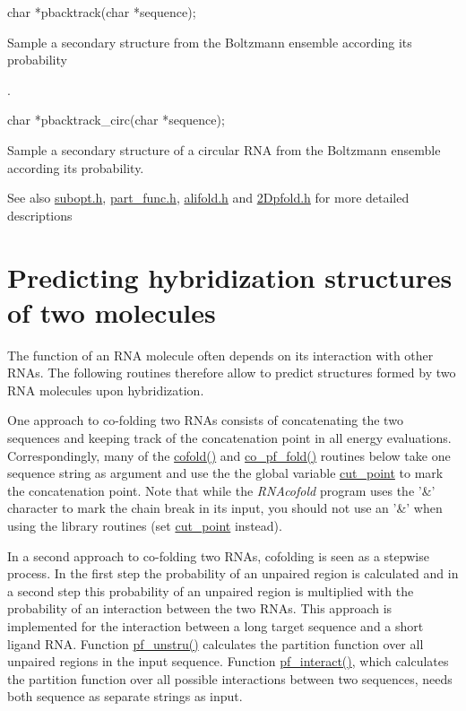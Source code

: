 \begin{DoxyVerb}
char    *pbacktrack(char *sequence);
\end{DoxyVerb}
 Sample a secondary structure from the Boltzmann ensemble according its probability\par
. 

\begin{DoxyVerb}
char    *pbacktrack_circ(char *sequence);
\end{DoxyVerb}
 Sample a secondary structure of a circular RNA from the Boltzmann ensemble according its probability. 

\begin{DoxySeeAlso}{See also}
\hyperlink{subopt_8h}{subopt.h}, \hyperlink{part__func_8h}{part\_\-func.h}, \hyperlink{alifold_8h}{alifold.h} and \hyperlink{2Dpfold_8h}{2Dpfold.h} for more detailed descriptions
\end{DoxySeeAlso}
\hypertarget{mp__fold_mp_Cofolding}{}\section{Predicting hybridization structures of two molecules}\label{mp__fold_mp_Cofolding}
The function of an RNA molecule often depends on its interaction with other RNAs. The following routines therefore allow to predict structures formed by two RNA molecules upon hybridization.\par
 One approach to co-\/folding two RNAs consists of concatenating the two sequences and keeping track of the concatenation point in all energy evaluations. Correspondingly, many of the \hyperlink{cofold_8h_abc8517f22cfe70595ee81fc837910d52}{cofold()} and \hyperlink{part__func__co_8h_aa86a5f998789ed71813d23d7307a791b}{co\_\-pf\_\-fold()} routines below take one sequence string as argument and use the the global variable \hyperlink{fold__vars_8h_ab9b2c3a37a5516614c06d0ab54b97cda}{cut\_\-point} to mark the concatenation point. Note that while the {\itshape RNAcofold\/} program uses the '\&' character to mark the chain break in its input, you should not use an '\&' when using the library routines (set \hyperlink{fold__vars_8h_ab9b2c3a37a5516614c06d0ab54b97cda}{cut\_\-point} instead).\par
 In a second approach to co-\/folding two RNAs, cofolding is seen as a stepwise process. In the first step the probability of an unpaired region is calculated and in a second step this probability of an unpaired region is multiplied with the probability of an interaction between the two RNAs. This approach is implemented for the interaction between a long target sequence and a short ligand RNA. Function \hyperlink{part__func__up_8h_a5b4ee40e190d2f633cd01cf0d2fe93cf}{pf\_\-unstru()} calculates the partition function over all unpaired regions in the input sequence. Function \hyperlink{part__func__up_8h_a1aa0aa02bc3a724f87360c03097afd00}{pf\_\-interact()}, which calculates the partition function over all possible interactions between two sequences, needs both sequence as separate strings as input.

